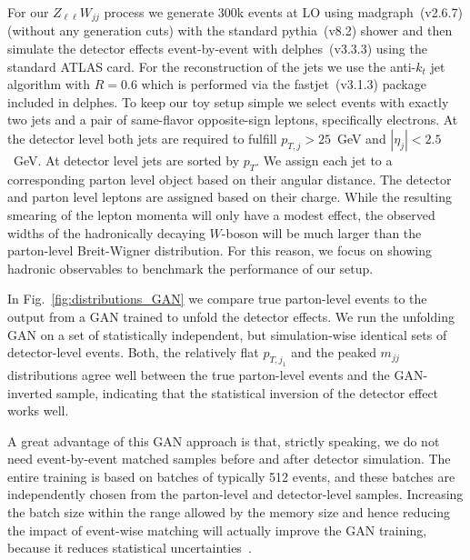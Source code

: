 For our $Z_{\ell \ell} W_{jj}$ process we generate 300k events at LO using
madgraph~(v2.6.7) \cite{madgraph} (without any generation cuts) with the standard
pythia~(v8.2) shower \cite{pythia} and then simulate the detector
effects event-by-event with delphes~(v3.3.3) \cite{delphes}  using the standard
ATLAS card. For the reconstruction of the jets we use the anti-$k_t$ jet algorithm \cite{anti_kt} with $R=0.6$ which is performed via the fastjet~(v3.1.3) \cite{FastJet} package included in delphes. To keep our toy setup simple we select events
with exactly two jets and a pair of same-flavor opposite-sign leptons,
specifically electrons. At the detector level both jets
are required to fulfill $p_{T, j} > 25$~GeV and $|\eta_j| <
2.5$~GeV. At detector level jets are sorted by $p_T$. We assign each
jet to a corresponding parton level object based on their angular
distance. The detector and parton level leptons are assigned based on
their charge. While the resulting smearing of the lepton momenta will
only have a modest effect, the observed widths of the hadronically
decaying $W$-boson will be much larger than the parton-level
Breit-Wigner distribution. For this reason, we focus on showing hadronic observables to benchmark the performance of our setup.

In Fig.~\ref{fig:distributions_GAN} we
compare true parton-level events to the output from a GAN trained to
unfold the detector effects.  We run the unfolding GAN on a set of
statistically independent, but simulation-wise identical sets of
detector-level events. Both, the relatively flat $p_{T,j_1}$ and the
peaked $m_{jj}$ distributions agree well between the true parton-level
events and the GAN-inverted sample, indicating that the statistical
inversion of the detector effect works well.

A great advantage of this GAN approach is that, strictly speaking,
we do not need event-by-event matched samples before and after
detector simulation. The entire training is based on batches of
typically 512 events, and these batches are independently chosen
from the parton-level and detector-level samples. Increasing the batch size
within the range allowed by the memory size and hence reducing the impact of
event-wise matching will actually improve the GAN training, because
it reduces statistical uncertainties~\cite{gan_phasespace}.

